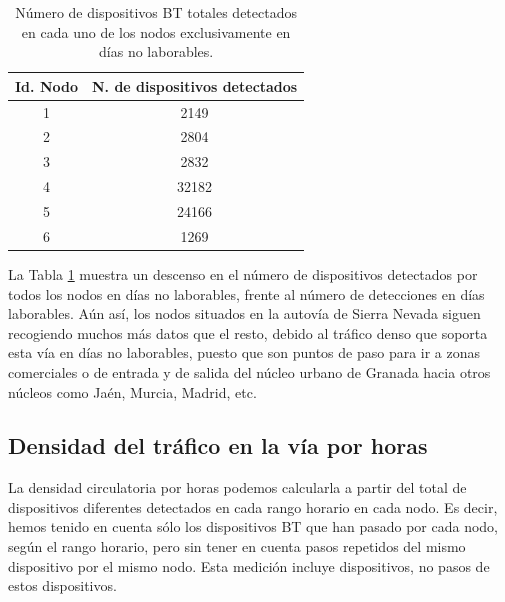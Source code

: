 \documentclass[twocolumn,twoside]{Jornadas}
\begin{document}
 \begin{table}
 \caption{Número de dispositivos BT totales detectados en cada uno de los nodos exclusivamente en días no laborables.
 \label{VehiculosFestivos}}
 \begin{center}
 \begin{tabular}{|c|c|}
 \hline
Id. Nodo  &  N. de dispositivos detectados  \\
 \hline
    1     &    2149  \\
 \hline
    2     &    2804  \\
 \hline
    3     &    2832  \\
 \hline
    4     &    32182  \\
 \hline
    5     &    24166  \\
 \hline
    6     &    1269  \\
 \hline
 \end{tabular}
 \end{center}
 \end{table}

La Tabla \ref{VehiculosFestivos} muestra un descenso en el número de dispositivos detectados por todos los nodos en días no laborables, frente al número de 
detecciones en días laborables. Aún así, los nodos situados en la autovía de Sierra Nevada siguen recogiendo muchos más datos que el resto, debido al 
tráfico denso que soporta esta vía en días no laborables, puesto que son puntos de paso para ir a zonas comerciales o de entrada y de salida del núcleo urbano de Granada hacia otros
núcleos como Jaén, Murcia, Madrid, etc.



\subsection{Densidad del tráfico en la vía por horas}

La densidad circulatoria por horas podemos calcularla a partir del total de dispositivos diferentes detectados en cada rango horario en cada nodo. Es decir, 
hemos tenido en cuenta sólo los dispositivos BT que han pasado por cada nodo, según el rango horario, pero sin tener en cuenta pasos repetidos del mismo dispositivo por el mismo nodo.
Esta medición incluye dispositivos, no pasos de estos dispositivos.
\end{document}
